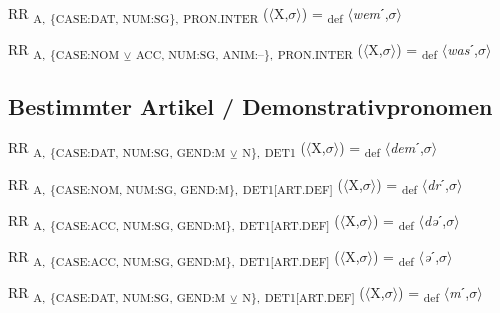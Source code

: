 {\begin{exe}
 RR \textsubscript{A,} \textsubscript{\{CASE:DAT, NUM:SG\},} \textsubscript{PRON.INTER} ($\langle$X,$\sigma $$\rangle$) = \textsubscript{def} $\langle$\textit{wem}ˊ,$\sigma $$\rangle$
\end{exe}

\begin{exe}
 RR \textsubscript{A,} \textsubscript{\{CASE:NOM} \textsubscript{${\veebar}$}\textsubscript{ ACC, NUM:SG, ANIM:–\},} \textsubscript{PRON.INTER} ($\langle$X,$\sigma $$\rangle$) = \textsubscript{def} $\langle$\textit{was}ˊ,$\sigma $$\rangle$
\end{exe}

\subsection{Bestimmter Artikel / Demonstrativpronomen}

\begin{exe}
 RR \textsubscript{A,} \textsubscript{\{CASE:DAT, NUM:SG, GEND:M} \textsubscript{${\veebar}$}\textsubscript{ N\},} \textsubscript{DET1} ($\langle$X,$\sigma $$\rangle$) = \textsubscript{def} $\langle$\textit{dem}ˊ,$\sigma $$\rangle$
\end{exe}

\begin{exe}
 RR \textsubscript{A,} \textsubscript{\{CASE:NOM, NUM:SG, GEND:M\},} \textsubscript{DET1[ART.DEF]} ($\langle$X,$\sigma $$\rangle$) = \textsubscript{def} $\langle$\textit{dr}ˊ,$\sigma $$\rangle$
\end{exe}

\begin{exe}
 RR \textsubscript{A,} \textsubscript{\{CASE:ACC, NUM:SG, GEND:M\},} \textsubscript{DET1[ART.DEF]} ($\langle$X,$\sigma $$\rangle$) = \textsubscript{def} $\langle$\textit{də}ˊ,$\sigma $$\rangle$
\end{exe}

\begin{exe}
 RR \textsubscript{A,} \textsubscript{\{CASE:ACC, NUM:SG, GEND:M\},} \textsubscript{DET1[ART.DEF]} ($\langle$X,$\sigma $$\rangle$) = \textsubscript{def} $\langle$\textit{ə}ˊ,$\sigma $$\rangle$
\end{exe}

\begin{exe}
 RR \textsubscript{A,} \textsubscript{\{CASE:DAT, NUM:SG, GEND:M} \textsubscript{${\veebar}$}\textsubscript{ N\},} \textsubscript{DET1[ART.DEF]} ($\langle$X,$\sigma $$\rangle$) = \textsubscript{def} $\langle$\textit{m}ˊ,$\sigma $$\rangle$
\end{exe}

}
